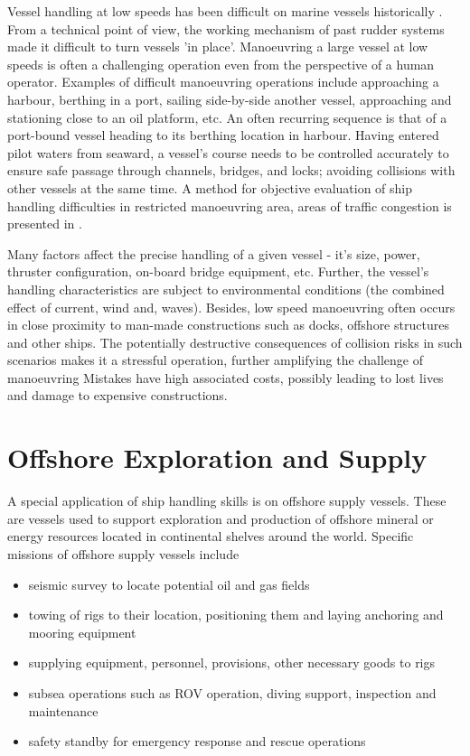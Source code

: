 Vessel handling at low speeds has been difficult on marine vessels historically \parencite{brittanica:ship}. From a technical point of view, the working mechanism of past rudder systems made it difficult to turn vessels 'in place'. Manoeuvring a large vessel at low speeds is often a challenging operation even from the perspective of a human operator. Examples of difficult manoeuvring operations include approaching a harbour, berthing in a port, sailing side-by-side another vessel, approaching and stationing close to an oil platform, etc. An often recurring sequence is that of a port-bound vessel heading to its berthing location in harbour. Having entered pilot waters from seaward, a vessel's course needs to be controlled accurately to ensure safe passage through channels, bridges, and locks; avoiding collisions with other vessels at the same time. A method for objective evaluation of ship handling difficulties in restricted manoeuvring area, areas of traffic congestion is presented in \parencite{inoue2000evaluation}.

Many factors affect the precise handling of a given vessel - it's size, power, thruster configuration, on-board bridge equipment, etc. Further, the vessel's handling characteristics are subject to environmental conditions (the combined effect of current, wind and, waves). Besides, low speed manoeuvring often occurs in close proximity to man-made constructions such as docks, offshore structures and other ships. The potentially destructive consequences of collision risks in such scenarios makes it a stressful operation, further amplifying the challenge of manoeuvring Mistakes have high associated costs, possibly leading to lost lives and damage to expensive constructions.

\section{Offshore Exploration and Supply}

A special application of ship handling skills is on offshore supply vessels. These are vessels used to support exploration and production of offshore mineral or energy resources located in continental shelves around the world. Specific missions of offshore supply vessels include 

\begin{itemize}\renewcommand{\labelitemi}{\tiny$\blacksquare$} 
\item seismic survey to locate potential oil and gas fields
\item towing of rigs to their location, positioning them and laying anchoring and mooring equipment
\item supplying equipment, personnel, provisions, other necessary goods to rigs
\item subsea operations such as ROV operation, diving support, inspection and maintenance
\item safety standby for emergency response and rescue operations
\end{itemize}

